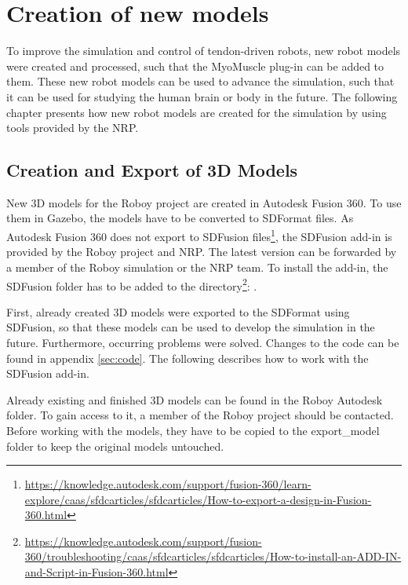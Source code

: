 
\chapter{Creation of new models}\label{chapter:Models}
To improve the simulation and control of tendon-driven robots, new robot models were created and processed, such that the MyoMuscle plug-in can be added to them. These new robot models can be used to advance the simulation, such that it can be used for studying the human brain or body in the future. The following chapter presents how new robot models are created for the simulation by using tools provided by the NRP.

\section{Creation and Export of 3D Models}
New 3D models for the Roboy project are created in Autodesk Fusion 360. To use them in Gazebo, the models have to be converted to SDFormat files. As Autodesk Fusion 360 does not export to SDFusion files\footnote{\url{https://knowledge.autodesk.com/support/fusion-360/learn-explore/caas/sfdcarticles/sfdcarticles/How-to-export-a-design-in-Fusion-360.html}}, the SDFusion add-in is provided by the Roboy project and NRP. The latest version can be forwarded by a member of the Roboy simulation or the NRP team. To install the add-in, the SDFusion folder has to be added to the directory\footnote{\url{https://knowledge.autodesk.com/support/fusion-360/troubleshooting/caas/sfdcarticles/sfdcarticles/How-to-install-an-ADD-IN-and-Script-in-Fusion-360.html}}: .%

First, already created 3D models were exported to the SDFormat using SDFusion, so that these models can be used to develop the simulation in the future. Furthermore, occurring problems were solved. Changes to the code can be found in appendix \ref{sec:code}. The following describes how to work with the SDFusion add-in.

Already existing and finished 3D models can be found in the Roboy Autodesk folder. To gain access to it, a member of the Roboy project should be contacted. Before working with the models, they have to be copied to the export\_model folder to keep the original models untouched.

